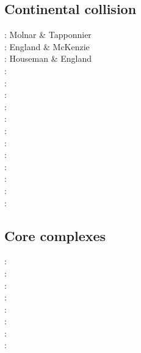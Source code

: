 \subsection*{Continental collision} 

\begin{scriptsize}
\nineteenseventyfive: Molnar \& Tapponnier \cite{mota75}\\
\nineteeneightytwo: England \& McKenzie \cite{enmc82} \\
\nineteeneightysix: Houseman \& England \cite{hoen86a}\\
\nineteenninetyeight: \cite{elbj98}\cite{bubr98}\\
\nineteenninetynine: \cite{elbe99}\cite{will99b}\\
\twothousand: \cite{sobm00}\\
\twothousandthree: \cite{refm03}\\
\twothousandfive: \cite{sobb05}\\
\twothousandnine: \cite{sckb09}\\
\twothousandeleven: \cite{lemk11}\\
\twothousandtwelve: \cite{mavf12}\\
\twothousandthirteen: \cite{scpo13}\\
\twothousandfourteen: \cite{lesh14}\\
\twothousandfifteen: \cite{puka15}\\
\twothousandeighteen: \cite{masg18}\cite{gesr18}
\end{scriptsize}

\subsection{Core complexes}

\begin{scriptsize}
\twothousandseven: \cite{gewm07}\\
\twothousandeight: \cite{tibb08}\\
\twothousandnine: \cite{tigv09}\\
\twothousandten: \cite{olbt10}\\
\twothousandtwelve: \cite{lehm12}\cite{scgb12}\\
\twothousandfifteen: \cite{pebu15}\\
\twothousandseventeen: \cite{esmp17}\\
\twothousandeighteen: \cite{brst18}
\end{scriptsize}

